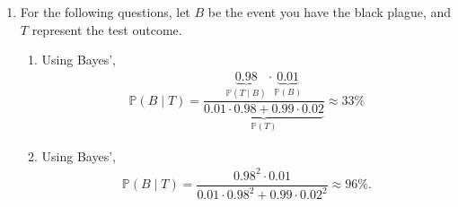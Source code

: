\documentclass[12pt]{article}
\begin{document}
\begin{enumerate}
\begin{enumerate}
        For example, $A = \{X_1 = H\}$ and $B = \{X_2 = H\}$ are
        independent for a fair coin, but conditioned on the two flips
        being the same face, they are no longer independent since
        $\mathbb P(A \cap B \mid C) = 1/2,$ while $\mathbb P(A \mid
        C) \mathbb P(B \mid C) = 1/4.$

      \item In other words, we are given that
        \begin{align*}
          \mathbb P(A \cap B \cap C) = \mathbb P(A \cap C) \mathbb P(B \cap C).
        \end{align*}

        Once again, consider the case where the probability of our
        coin being double sided is $10\%.$ Given that it is not
        double-sided (C), $A$ and $B$ are independent, however in the
        usual sense $A$ and $B$ are not independent, since there is a
        chance that the coin is biased.
    \end{enumerate}

  \item For the following questions, let $B$ be the event you have
    the black plague, and $T$ represent the test outcome.
    \begin{enumerate}
      \item Using Bayes',
        \begin{align*}
          \mathbb P(B \mid T) = \dfrac{\underbrace{0.98}_{\mathbb P(T
            \mid B)} \cdot \underbrace{0.01}_{\mathbb
          P(B)}}{\underbrace{0.01 \cdot 0.98 + 0.99 \cdot
          0.02}_{\mathbb P(T)}} \approx 33\%
        \end{align*}

      \item Using Bayes',
        \begin{align*}
          \mathbb P(B \mid T) = \dfrac{0.98^2 \cdot 0.01}{0.01 \cdot
          0.98^2 + 0.99 \cdot 0.02^2} \approx 96\%.
        \end{align*}
    \end{enumerate}


\end{enumerate}
\end{document}
